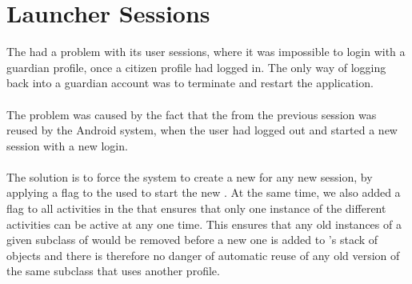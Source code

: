 
\section{Launcher Sessions}
\label{sec:launcher_session_issues}

The \launcher had a problem with its user sessions, where it was impossible to login with a guardian profile, once a citizen profile had logged in. The only way of logging back into a guardian account was to terminate and restart the application.
\\\\
The problem was caused by the fact that the  from the previous session was reused by the Android system, when the user had logged out and started a new session with a new login.
\\\\
The solution is to force the system to create a new  for any new session, by applying a flag to the  used to start the new . At the same time, we also added a flag to all activities in the \launcher that ensures that only one instance of the different activities can be active at any one time. 
This ensures that any old instances of a given subclass of  would be removed before a new one is added to \launcher's stack of  objects and there is therefore no danger of automatic reuse of any old version of the same  subclass that uses another profile. 

